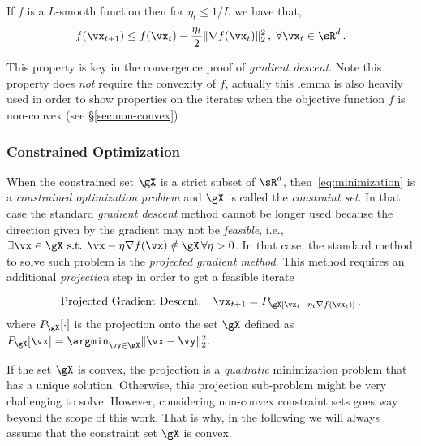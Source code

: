 \begin{lemma}\label{lemma:GDdescent_lemma}

If $f$ is a $L$-smooth function then for $\eta_t \leq 1/L$ we have that,
\begin{equation}
f(\vx_{t+1}) \leq f(\vx_t) - \frac{\eta_t}{2} \|\nabla f(\vx_t)\|_2^2 \, , \; \forall \vx_t \in \sR^d \,.
\end{equation}
\end{lemma}

This property is key in the convergence proof of \emph{gradient descent}. Note this property does \emph{not} require the convexity of $f$, actually this lemma is also heavily used in order to show properties on the iterates when the objective function $f$ is non-convex (see \S\ref{sec:non-convex})




\subsubsection{Constrained Optimization}




When the constrained set $\gX$ is a strict subset of $\sR^d$, then~\eqref{eq:minimization} is a \emph{constrained optimization problem} and $\gX$ is called the \emph{constraint set}. In that case the standard \emph{gradient descent} method cannot be longer used because the direction given by the gradient may not be \emph{feasible}, i.e., $\exists \vx \in \gX \text{ s.t. } \vx - \eta \nabla f(\vx) \notin \gX\,\forall \eta >0 $. In that case, the standard method to solve such problem is the \emph{projected gradient method}. This method requires an additional \emph{projection} step in order to get a feasible iterate

\begin{equation}\label{eq:gradient_descent}
\text{Projected Gradient Descent:} \quad \vx_{t+1} = P_\gX[\vx_t - \eta_t \nabla f(\vx_t)] \,,
\end{equation}
\noindent where $P_{\gX}[\cdot]$ is the projection onto the set $\gX$ defined as $P_{\gX}[\vx] = \argmin_{\vy \in \gX} \| \vx-\vy\|_2^2 $.


If the set $\gX$ is convex, the projection is a \emph{quadratic} minimization problem that has a unique solution. Otherwise, this projection sub-problem might be very challenging to solve. However, considering non-convex constraint sets goes way beyond the scope of this work. That is why, in the following we will always assume that the constraint set $\gX$ is convex.




